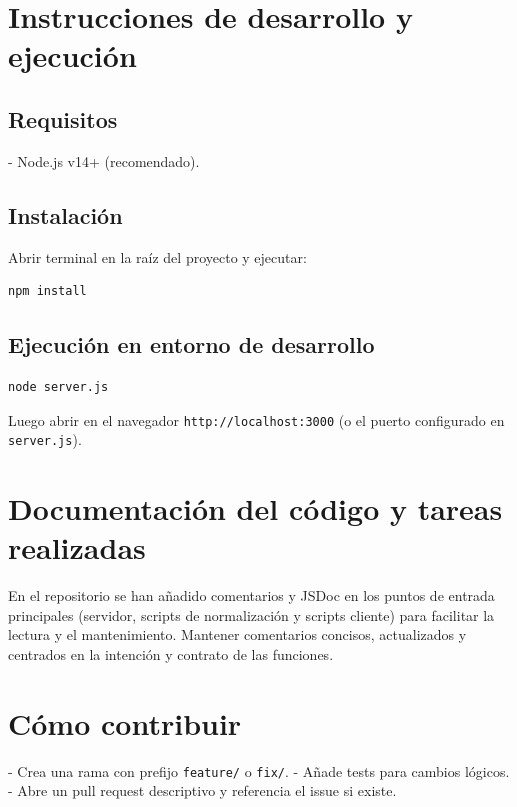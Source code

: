 \documentclass[11pt,a4paper]{article}
\begin{document}
\section{Instrucciones de desarrollo y ejecución}
\subsection{Requisitos}
- Node.js v14+ (recomendado). 

\subsection{Instalación}
Abrir terminal en la raíz del proyecto y ejecutar:
\begin{lstlisting}
npm install
\end{lstlisting}

\subsection{Ejecución en entorno de desarrollo}
\begin{lstlisting}
node server.js
\end{lstlisting}
Luego abrir en el navegador \texttt{http://localhost:3000} (o el puerto configurado en \texttt{server.js}).

\section{Documentación del código y tareas realizadas}
En el repositorio se han añadido comentarios y JSDoc en los puntos de entrada principales (servidor, scripts de normalización y scripts cliente) para facilitar la lectura y el mantenimiento. Mantener comentarios concisos, actualizados y centrados en la intención y contrato de las funciones.

\section{Cómo contribuir}
- Crea una rama con prefijo \texttt{feature/} o \texttt{fix/}. 
- Añade tests para cambios lógicos. 
- Abre un pull request descriptivo y referencia el issue si existe.
\end{document}
